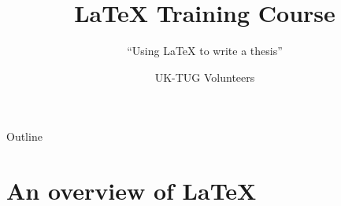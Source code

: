 \usepackage[T1]{fontenc}
\usepackage{babel,booktabs,csquotes,lmodern,tikz,verbatim}

\usetikzlibrary{shapes}

\newcommand*{\BibTeX}{BibTeX}
\newcommand*{\cls}[1]{\textsf{#1}}
\newcommand*{\cs}[1]{\texttt{\char`\\#1}}
\newcommand*{\marg}[1]{\texttt{\char`\{#1\char`\}}}
\newcommand*{\meta}[1]{\ensuremath{\langle}\emph{#1}\ensuremath{\rangle}}
\newcommand*{\oarg}[1]{\texttt{[#1]}}
\newcommand*{\pkg}[1]{\textsf{#1}}

\renewcommand*{\url}[1]{\href{http://#1}{\texttt{#1}}}

\AtBeginDocument
  {
    \renewcommand*{\LaTeX}{LaTeX}
    \renewcommand*{\LaTeXe}{LaTeX2e}
    \renewcommand*{\TeX}{TeX}
  }

\title{\LaTeX{} Training Course}
\subtitle{\enquote{Using \LaTeX{} to write a thesis}}
\date{}
\author{UK-TUG Volunteers}



\begin{frame}
  \titlepage
\end{frame}

\maketitle


\tableofcontents

%
  {
    \begin{frame}{Outline}
      \tableofcontents
    \end{frame}
  }

\section{An overview of \LaTeX{}}

